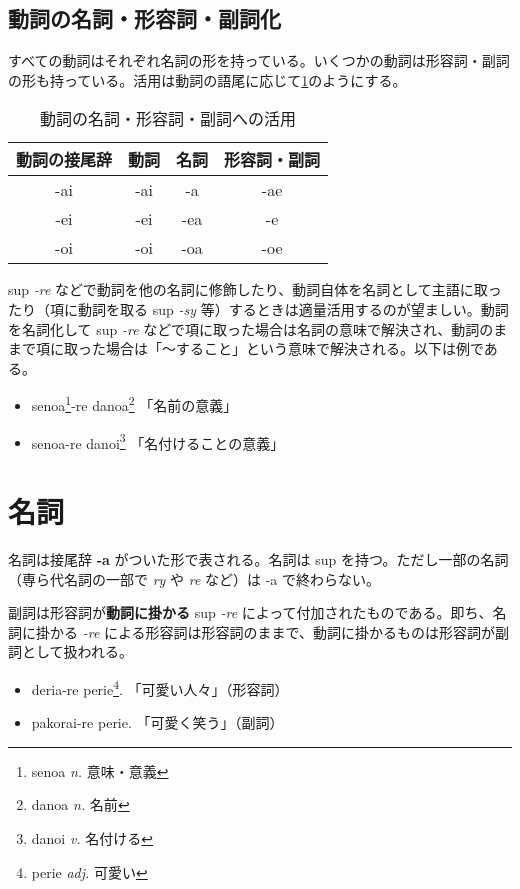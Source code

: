 \subsection{動詞の名詞・形容詞・副詞化}

すべての動詞はそれぞれ名詞の形を持っている。いくつかの動詞は形容詞・副詞の形も持っている。活用は動詞の語尾に応じて\cref{table:conjugation-of-verb}のようにする。

\begin{table}[h]
    \centering
    \caption{動詞の名詞・形容詞・副詞への活用}
    \label{table:conjugation-of-verb}
    \begin{tabular}{cccc}
        \hline
        動詞の接尾辞 & 動詞 & 名詞 & 形容詞・副詞 \\
        \hline \hline
        -ai & -ai & -a  & -ae \\
        -ei & -ei & -ea & -e  \\
        -oi & -oi & -oa & -oe \\
        \hline
    \end{tabular}
\end{table}

sup \emph{-re} などで動詞を他の名詞に修飾したり、動詞自体を名詞として主語に取ったり（項に動詞を取る sup \emph{-sy} 等）するときは適量活用するのが望ましい。動詞を名詞化して sup \emph{-re} などで項に取った場合は名詞の意味で解決され、動詞のままで項に取った場合は「～すること」という意味で解決される。以下は例である。

\begin{itemize}
    \item senoa\footnote{senoa \emph{n.} 意味・意義}-re danoa\footnote{danoa \emph{n.} 名前} 「名前の意義」
    \item senoa-re danoi\footnote{danoi \emph{v.} 名付ける} 「名付けることの意義」
\end{itemize}

\section{名詞}

名詞は接尾辞 \textbf{-a} がついた形で表される。名詞は sup を持つ。ただし一部の名詞（専ら代名詞の一部で \emph{ry} や \emph{re} など）は -a で終わらない。

副詞は形容詞が\textbf{動詞に掛かる} sup \emph{-re} によって付加されたものである。即ち、名詞に掛かる \emph{-re} による形容詞は形容詞のままで、動詞に掛かるものは形容詞が副詞として扱われる。

\begin{itemize}
    \item deria-re perie\footnote{perie \emph{adj.} 可愛い}. 「可愛い人々」（形容詞）
    \item pakorai-re perie. 「可愛く笑う」（副詞）
\end{itemize}

